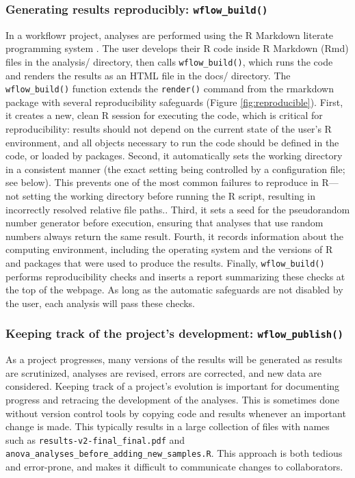\documentclass[9pt,a4paper]{extarticle}
\begin{document}
\subsubsection*{Generating results reproducibly: \texttt{wflow\_build()}}

In a workflowr project, analyses are performed using the R Markdown
literate programming system \cite{Xie2018}. The user develops their R
code inside R Markdown (Rmd) files in the analysis/ directory, then
calls \texttt{wflow\_build()}, which runs the code and renders the results as an
HTML file in the docs/ directory. The \texttt{wflow\_build()} function extends the
\texttt{render()} command from the rmarkdown package with several reproducibility
safeguards (Figure \ref{fig:reproducible}). First, it creates a new, clean R session for
executing the code, which is critical for reproducibility: results
should not depend on the current state of the user's R environment, and
all objects necessary to run the code should be defined in the code, or
loaded by packages. Second, it automatically sets the working directory
in a consistent manner (the exact setting being controlled by a
configuration file; see below). This prevents one of the most common
failures to reproduce in R—not setting the working directory before
running the R script, resulting in incorrectly resolved relative file
paths.. Third, it sets a seed for the pseudorandom number generator
before execution, ensuring that analyses that use random numbers always
return the same result. Fourth, it records information about the
computing environment, including the operating system and the versions
of R and packages that were used to produce the results. Finally,
\texttt{wflow\_build()} performs reproducibility checks and inserts a report
summarizing these checks at the top of the webpage. As long as the
automatic safeguards are not disabled by the user, each analysis will
pass these checks.

\subsubsection*{Keeping track of the project's development: \texttt{wflow\_publish()}}

As a project progresses, many versions of the results will be generated
as results are scrutinized, analyses are revised, errors are corrected,
and new data are considered. Keeping track of a project's evolution is
important for documenting progress and retracing the development of the
analyses. This is sometimes done without version control tools by
copying code and results whenever an important change is made. This
typically results in a large collection of files with names such as
\texttt{results-v2-final\_final.pdf} and
\texttt{anova\_analyses\_before\_adding\_new\_samples.R}. This approach
is both tedious and error-prone, and makes it difficult to communicate
changes to collaborators.
\end{document}
